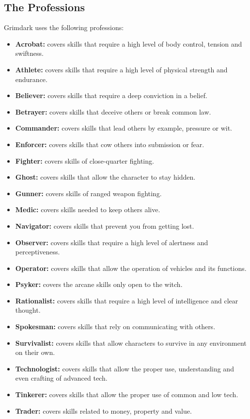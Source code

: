 \subsection{The Professions}
Grimdark uses the following professions:
\begin{itemize}
	\item \textbf{Acrobat:} covers skills that require a high level of body control, tension and swiftness.
	\item \textbf{Athlete:} covers skills that require a high level of physical strength and endurance.
	\item \textbf{Believer:} covers skills that require a deep conviction in a belief.
	\item \textbf{Betrayer:} covers skills that deceive others or break common law.
	\item \textbf{Commander:} covers skills that lead others by example, pressure or wit.
	\item \textbf{Enforcer:} covers skills that cow others into submission or fear.
	\item \textbf{Fighter:} covers skills of close-quarter fighting.
	\item \textbf{Ghost:} covers skills that allow the character to stay hidden.
	\item \textbf{Gunner:} covers skills of ranged weapon fighting.
	\item \textbf{Medic:} covers skills needed to keep others alive.
	\item \textbf{Navigator:} covers skills that prevent you from getting lost.
	\item \textbf{Observer:} covers skills that require a high level of alertness and perceptiveness.
	\item \textbf{Operator:} covers skills that allow the operation of vehicles and its functions.
	\item \textbf{Psyker:} covers the arcane skills only open to the witch.
	\item \textbf{Rationalist:} covers skills that require a high level of intelligence and clear thought.
	\item \textbf{Spokesman:} covers skills that rely on communicating with others.
	\item \textbf{Survivalist:} covers skills that allow characters to survive in any environment on their own.
	\item \textbf{Technologist:} covers skills that allow the proper use, understanding and even crafting of advanced tech.
	\item \textbf{Tinkerer:} covers skills that allow the proper use of common and low tech.
	\item \textbf{Trader:} covers skills related to money, property and value.
\end{itemize}


